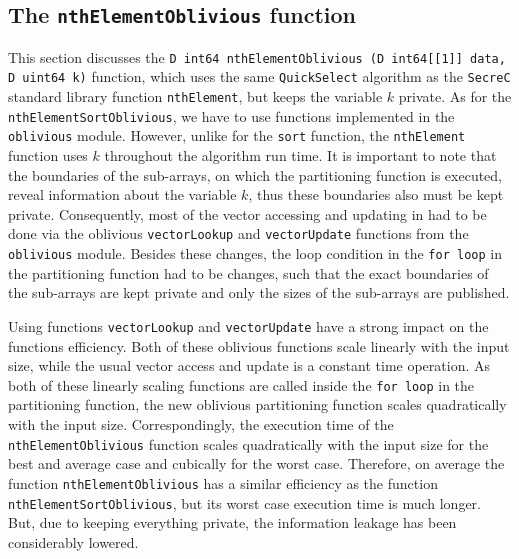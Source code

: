 \documentclass[11pt]{article}
\newcommand{\ct}[1]{\texttt{#1}}
\newcommand{\SC}{\ct{SecreC}\xspace}
\begin{document}


\subsection{The \ct{nthElementOblivious} function} %
\label{sub:the_nthelementoblivious_function}

This section discusses the \ct{D int64 nthElementOblivious (D int64[[1]] data, D uint64 k)} function, which uses the same \ct{QuickSelect} algorithm as the \SC standard library function \ct{nthElement}, but keeps the variable $k$ private. As for the \ct{nthElementSortOblivious}, we have to use functions implemented in the \ct{oblivious} module. However, unlike for the \ct{sort} function, the \ct{nthElement} function uses $k$ throughout the algorithm run time. It is important to note that the boundaries of the sub-arrays, on which the partitioning function is executed, reveal information about the variable $k$, thus these boundaries also must be kept private. Consequently, most of the vector accessing and updating in had to be done via the oblivious \ct{vectorLookup} and \ct{vectorUpdate} functions from the \ct{oblivious} module. Besides these changes, the loop condition in the \ct{for loop} in the partitioning function had to be changes, such that the exact boundaries of the sub-arrays are kept private and only the sizes of the sub-arrays are published.   

Using functions \ct{vectorLookup} and \ct{vectorUpdate} have a strong impact on the functions efficiency. Both of these oblivious functions scale linearly with the input size, while the usual vector access and update is a constant time operation. As both of these linearly scaling functions are called inside the \ct{for loop} in the partitioning function, the new oblivious partitioning function scales quadratically with the input size. Correspondingly, the execution time of the \ct{nthElementOblivious} function scales quadratically with the input size for the best and average case and cubically for the worst case. Therefore, on average the function \ct{nthElementOblivious} has a similar efficiency as the function \ct{nthElementSortOblivious}, but its worst case execution time is much longer. But, due to keeping everything private, the information leakage has been considerably lowered. 






% 
\end{document}
